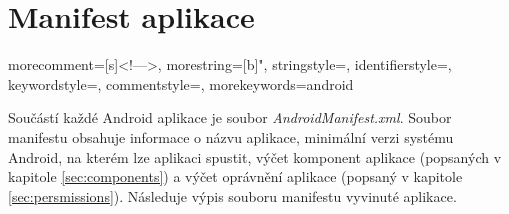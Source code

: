 \documentclass{diplomka}
\begin{document}
\chapter{Manifest aplikace}
\label{manifest}

{
  morecomment=[s]{<!--}{-->},
  morestring=[b]",
  stringstyle=\color{green},
  identifierstyle=\color{darkblue},
  keywordstyle=\color{cyan},
  commentstyle=\color{gray}\upshape,
  morekeywords={android}%
}

\lstset{
  language=XML,
  basicstyle=\ttfamily,
  columns=fullflexible,
  showstringspaces=false,
breaklines=true,  
numbers=left,    
}

Součástí každé Android aplikace je soubor \emph{AndroidManifest.xml}. Soubor manifestu obsahuje informace o názvu aplikace, minimální verzi systému Android, na kterém lze aplikaci spustit, výčet komponent aplikace (popsaných v kapitole \ref{sec:components}) a výčet oprávnění aplikace (popsaný v kapitole \ref{sec:persmissions}). Následuje výpis souboru manifestu vyvinuté aplikace.
\end{document}
